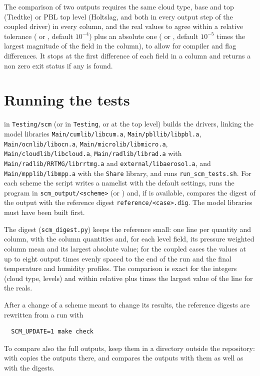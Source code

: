 The comparison of two outputs requires the same cloud type, base and top
(Tiedtke) or PBL top level (Holtslag, and both in every output step of
the coupled driver) in every column, and the real values to agree within
a relative tolerance
( or , default $10^{-4}$) plus an absolute one
( or , default $10^{-5}$ times the largest
magnitude of the field in the column), to allow for compiler and flag
differences. It stops at the first difference of each field in a column
and returns a non zero exit status if any is found.

\section{Running the tests}

 in \verb=Testing/scm= (or in \verb=Testing=, or at the
top level) builds the drivers, linking the model libraries
\verb=Main/cumlib/libcum.a=, \verb=Main/pbllib/libpbl.a=,
\verb=Main/ocnlib/libocn.a=, \verb=Main/microlib/libmicro.a=,
\verb=Main/cloudlib/libcloud.a=, \verb=Main/radlib/librad.a= with
\verb=Main/radlib/RRTMG/librrtmg.a= and \verb=external/libaerosol.a=,
and \verb=Main/mpplib/libmpp.a= with the
\verb=Share= library, and runs \verb=run_scm_tests.sh=. For each scheme the
script writes a namelist with the default settings, runs the program in
\verb=scm_output/<scheme>= (or ) and, if 
is available, compares the digest of the output with the reference
digest \verb=reference/<case>.dig=. The model libraries must have been
built first.

The digest (\verb=scm_digest.py=) keeps the reference small: one line per
quantity and column, with the column quantities and, for each level
field, its pressure weighted column mean and its largest absolute value;
for the coupled cases the values at up to eight output times evenly
spaced to the end of the run and the final temperature and humidity
profiles. The comparison is exact for the integers (cloud type, levels)
and within  relative plus  times the
largest value of the line for the reals.

After a change of a scheme meant to change its results, the reference
digests are rewritten from a run with
\begin{verbatim}
  SCM_UPDATE=1 make check
\end{verbatim}
To compare also the full outputs, keep them in a directory outside the
repository:  with  copies
the outputs there, and  compares the
outputs with them as well as with the digests.

